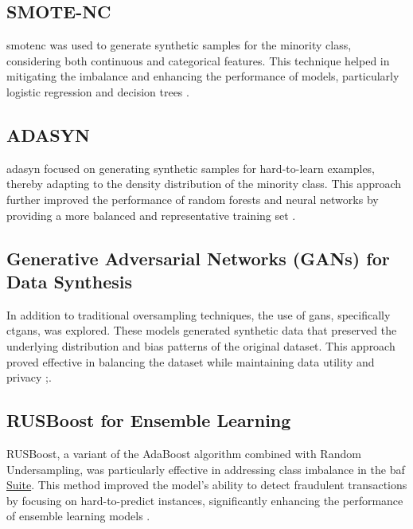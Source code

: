 \documentclass[12pt,a4paper]{report}
\begin{document}
\subsection{SMOTE-NC}
\acrshort{smotenc} was used to generate synthetic samples for the minority class, considering both continuous and categorical features. This technique helped in mitigating the imbalance and enhancing the performance of models, particularly logistic regression and decision trees \citep{chawla2002smote}.\\

\subsection{ADASYN}
\acrshort{adasyn} focused on generating synthetic samples for hard-to-learn examples, thereby adapting to the density distribution of the minority class. This approach further improved the performance of random forests and neural networks by providing a more balanced and representative training set \citep{he2008adasyn}.\\

\subsection{Generative Adversarial Networks (GANs) for Data Synthesis}
In addition to traditional oversampling techniques, the use of \acrshort{gan}s, specifically \acrshort{ctgan}s, was explored. These models generated synthetic data that preserved the underlying distribution and bias patterns of the original dataset. This approach proved effective in balancing the dataset while maintaining data utility and privacy \citep{xu2019modeling};\citep{jesus2022turning}.\\


\subsection{RUSBoost for Ensemble Learning}
RUSBoost, a variant of the AdaBoost algorithm combined with Random Undersampling, was particularly effective in addressing class imbalance in the \acrshort{baf} \href{https://www.kaggle.com/datasets/sgpjesus/bank-account-fraud-dataset-neurips-2022/code}{Suite}. This method improved the model's ability to detect fraudulent transactions by focusing on hard-to-predict instances, significantly enhancing the performance of ensemble learning models \citep{bao2020detecting}.\\
\end{document}
